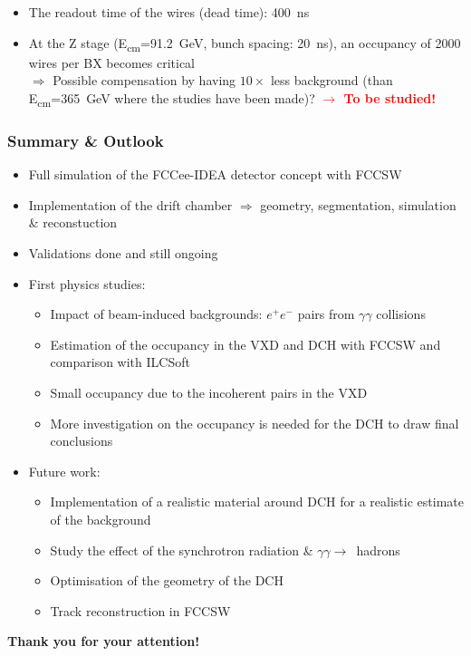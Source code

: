 \documentclass[aspectratio=169, hyperref={colorlinks=true,pdfpagelabels=false,linkcolor=black}, xcolor=dvipsnames,10pt]{beamer}
\begin{document}
\begin{frame}
        \vspace{-0.2cm}
	\begin{itemize}
	\item The readout time of the wires (dead time): 400~ns
        \item At the Z stage (E\textsubscript{cm}=91.2~GeV, bunch
          spacing: 20~ns), an occupancy of 2000 wires per BX
          becomes critical \\
          $\Rightarrow$ Possible compensation by having $10\times$
          less background (than E\textsubscript{cm}=365~GeV where the
          studies have been made)?  \textbf{\textcolor{red}{$\rightarrow$ To be
            studied!}}
	\end{itemize}
	
\end{frame}


\label{lastslide}
\begin{frame}
  \frametitle{Summary \& Outlook}
  
  	\vspace{1cm}
	\begin{itemize}
	\item Full simulation of the FCCee-IDEA detector concept with FCCSW
	\item Implementation of the drift chamber 
		$\Rightarrow$ geometry, segmentation, simulation \& reconstuction
	\item Validations done and still ongoing 
	\item First physics studies:
		\begin{itemize}
		\item Impact of beam-induced backgrounds: $e^{+}e^{-}$ pairs from $\gamma\gamma$ collisions
	  	\item Estimation of the occupancy in the VXD and DCH with FCCSW and comparison with ILCSoft
	  	\item Small occupancy due to the incoherent pairs in the VXD
	  	\item More investigation on the occupancy is needed for the DCH to draw final conclusions
	  	\end{itemize}
	\item Future work:
		\begin{itemize}
		\item Implementation of a realistic material around DCH for a realistic estimate of the background
		\item Study the effect of the synchrotron radiation \& $\gamma\gamma\rightarrow$~hadrons
		\item Optimisation of the geometry of the DCH
		\item Track reconstruction in FCCSW
		\end{itemize}
  	\end{itemize}

	\vspace{1cm}
	\centering
	\Large{\textbf{Thank you for your attention!}}
\end{frame}
\end{document}

